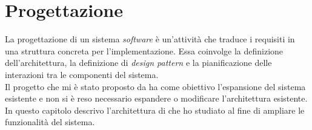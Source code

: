 \section{Progettazione}\label{chap:studio}

La progettazione di un sistema \textit{software} è un'attività che traduce i requisiti in una struttura concreta per 
l'implementazione. Essa coinvolge la definizione dell'architettura, la definizione di \textit{design pattern} e la 
pianificazione delle interazioni tra le componenti del sistema.\\
Il progetto che mi è stato proposto da {\company} ha come obiettivo l'espansione del sistema esistente e non si è reso 
necessario espandere o modificare l'architettura esistente.\\
In questo capitolo descrivo l'architettura di {\movi} che ho studiato al fine di ampliare le funzionalità del sistema.







